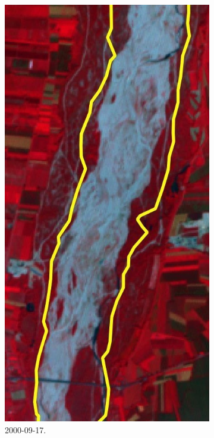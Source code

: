 \begin{description}
\begin{figure}[t]
\begin{subfigure}[b]{0.296\textwidth}
			\includegraphics[width=\textwidth]{files/esempio_mask_2000_09_17.jpeg}
			\caption{\AST{} 2000-09-17.}
		\end{subfigure}
		\qquad
		\begin{subfigure}[b]{0.30\textwidth}

\end{subfigure}
\end{figure}
\end{description}
